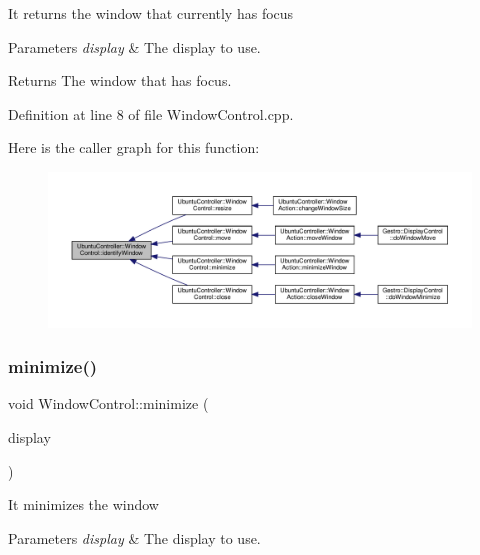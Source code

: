 It returns the window that currently has focus


\begin{DoxyParams}{Parameters}
{\em display} & The display to use.\\
\hline
\end{DoxyParams}
\begin{DoxyReturn}{Returns}
The window that has focus. 
\end{DoxyReturn}


Definition at line 8 of file Window\+Control.\+cpp.

Here is the caller graph for this function\+:
\nopagebreak
\begin{figure}[H]
\begin{center}
\leavevmode
\includegraphics[width=350pt]{class_ubuntu_controller_1_1_window_control_aad092a22b19664df4d94fe9a853d350a_icgraph}
\end{center}
\end{figure}
\mbox{\label{class_ubuntu_controller_1_1_window_control_abb8d0ae3c43be976259181c848fa4568}} 
\subsubsection{\texorpdfstring{minimize()}{minimize()}}
{\footnotesize\ttfamily void Window\+Control\+::minimize (\begin{DoxyParamCaption}\item[{Display $\ast$}]{display }\end{DoxyParamCaption})}

It minimizes the window


\begin{DoxyParams}{Parameters}
{\em display} & The display to use. \\
\hline
\end{DoxyParams}


